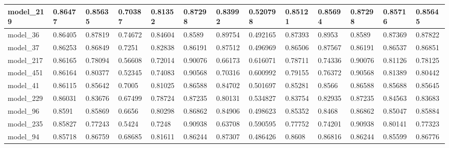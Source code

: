 \begin{tabular}{|l|l|l|l|l|l|l|l|l|l|l|l|l|}
model\_219     & 0.86477     & 0.85635        & 0.70387      & 0.81352          & 0.87298              & 0.83992              & 0.520798     & 0.85121           & 0.85694            & 0.87298         & 0.85716     & 0.85645      \\ \hline
model\_36      & 0.86405     & 0.87819        & 0.74672      & 0.84604          & 0.8589               & 0.89754              & 0.492165     & 0.87393           & 0.8953             & 0.8589          & 0.87369     & 0.87822      \\ \hline
model\_37      & 0.86253     & 0.86849        & 0.7251       & 0.82838          & 0.86191              & 0.87512              & 0.496969     & 0.86506           & 0.87567            & 0.86191         & 0.86537     & 0.86851      \\ \hline
model\_217     & 0.86165     & 0.78094        & 0.56608      & 0.72014          & 0.90076              & 0.66173              & 0.616071     & 0.78711           & 0.74336            & 0.90076         & 0.81126     & 0.78125      \\ \hline
model\_451     & 0.86164     & 0.80377        & 0.52345      & 0.74083          & 0.90568              & 0.70316              & 0.600992     & 0.79155           & 0.76372            & 0.90568         & 0.81389     & 0.80442      \\ \hline
model\_41      & 0.86115     & 0.85642        & 0.7005       & 0.81025          & 0.86588              & 0.84702              & 0.501697     & 0.85281           & 0.8566             & 0.86588         & 0.85688     & 0.85645      \\ \hline
model\_229     & 0.86031     & 0.83676        & 0.67499      & 0.78724          & 0.87235              & 0.80131              & 0.534827     & 0.83754           & 0.82935            & 0.87235         & 0.84563     & 0.83683      \\ \hline
model\_96      & 0.8591      & 0.85869        & 0.6656       & 0.80298          & 0.86862              & 0.84906              & 0.498623     & 0.85352           & 0.8468             & 0.86862         & 0.85047     & 0.85884      \\ \hline
model\_235     & 0.85827     & 0.77243        & 0.5424       & 0.7248           & 0.90938              & 0.63708              & 0.590595     & 0.77752           & 0.74201            & 0.90938         & 0.80141     & 0.77323      \\ \hline
model\_94      & 0.85718     & 0.86759        & 0.68685      & 0.81611          & 0.86244              & 0.87307              & 0.486426     & 0.8608            & 0.86816            & 0.86244         & 0.85599     & 0.86776      \\ \hline

\end{tabular}
